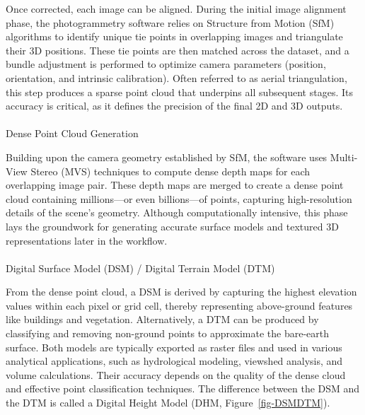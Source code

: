 \documentclass[
  letterpaper,
  11pt,
  english,
  singlespacing,
  headsepline]{MastersDoctoralThesis}
\makeatletter
\let\oldparagraph\paragraph
\renewcommand{\paragraph}{
    \@ifstar
      \xxxParagraphStar
      \xxxParagraphNoStar
  }
\newcommand{\xxxParagraphStar}[1]{\oldparagraph*{#1}\mbox{}}
\newcommand{\xxxParagraphNoStar}[1]{\oldparagraph{#1}\mbox{}}
\makeatother
\begin{document}
\begin{spacing}{1.5}
Once corrected, each image can be aligned. During the initial image
alignment phase, the photogrammetry software relies on Structure from
Motion (SfM) algorithms to identify unique tie points in overlapping
images and triangulate their 3D positions. These tie points are then
matched across the dataset, and a bundle adjustment is performed to
optimize camera parameters (position, orientation, and intrinsic
calibration). Often referred to as aerial triangulation, this step
produces a sparse point cloud that underpins all subsequent stages. Its
accuracy is critical, as it defines the precision of the final 2D and 3D
outputs.

\paragraph{Dense Point Cloud Generation}\label{sec-DPC}

Building upon the camera geometry established by SfM, the software uses
Multi-View Stereo (MVS) techniques to compute dense depth maps for each
overlapping image pair. These depth maps are merged to create a dense
point cloud containing millions---or even billions---of points,
capturing high-resolution details of the scene's geometry. Although
computationally intensive, this phase lays the groundwork for generating
accurate surface models and textured 3D representations later in the
workflow.

\paragraph{Digital Surface Model (DSM) / Digital Terrain Model
(DTM)}\label{digital-surface-model-dsm-digital-terrain-model-dtm}

From the dense point cloud, a DSM is derived by capturing the highest
elevation values within each pixel or grid cell, thereby representing
above-ground features like buildings and vegetation. Alternatively, a
DTM can be produced by classifying and removing non-ground points to
approximate the bare-earth surface. Both models are typically exported
as raster files and used in various analytical applications, such as
hydrological modeling, viewshed analysis, and volume calculations. Their
accuracy depends on the quality of the dense cloud and effective point
classification techniques. The difference between the DSM and the DTM is
called a Digital Height Model (DHM, Figure~\ref{fig-DSMDTM}).

\begin{figure}


\end{figure}
\end{spacing}
\end{document}
